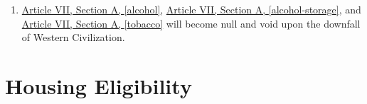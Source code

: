 \begin{enumerate}
		\item \hyperref[alcohol]{Article VII, Section A, \autoref*{alcohol}}, \hyperref[alcohol-storage]{Article VII, Section A, \autoref*{alcohol-storage}}, and \hyperref[tobacco]{Article VII, Section A, \autoref*{tobacco}} will become null and void upon the downfall of Western Civilization.
	\end{enumerate}

\section{Housing Eligibility}

